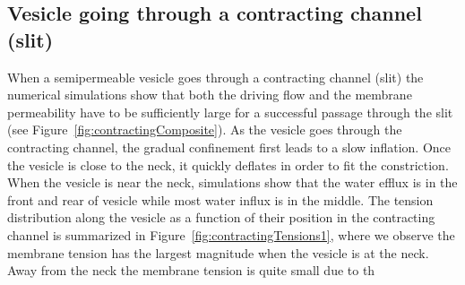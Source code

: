 \documentclass[9pt,twocolumn,twoside,lineno]{pnas-new}
\begin{document}
\subsection*{Vesicle going through a contracting channel (slit)}
When a semipermeable vesicle goes through a contracting channel (slit)
the numerical simulations show that both the driving flow and the
membrane permeability have to be sufficiently large for a successful
passage through the slit (see Figure~\ref{fig:contractingComposite}). As
the vesicle goes through the contracting channel, the gradual
confinement first leads to a slow inflation. Once the vesicle is close
to the neck, it quickly deflates in order to fit the constriction. When
the vesicle is near the neck, simulations show that the water efflux is
in the front and rear of vesicle while most water influx is in the
middle. The tension distribution along the vesicle as a function of
their position in the contracting channel is summarized in
Figure~\ref{fig:contractingTensions1}, where we observe the membrane
tension has the largest magnitude when the vesicle is at the neck. Away
from the neck the membrane tension is quite small due to th
\end{document}
